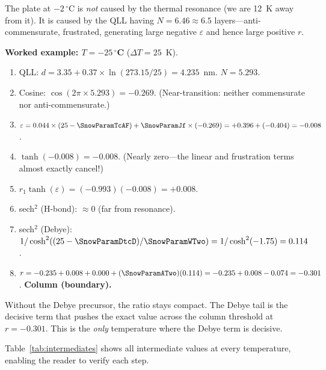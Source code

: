 \documentclass[12pt,letterpaper]{article}
\begin{document}
The plate at $-2\,{}^\circ$C is \emph{not} caused by the thermal resonance (we are 12~K away from it).  It is caused by the QLL having $N = 6.46 \approx 6.5$ layers---anti-commensurate, frustrated, generating large negative $\varepsilon$ and hence large positive $r$.

\medskip
\textbf{Worked example: $T = -25\,{}^\circ$C} ($\Delta T = 25$~K).

\begin{enumerate}
\item QLL: $d = 3.35 + 0.37 \times \ln(273.15/25) = 4.235$~nm.  $N = 5.293$.
\item Cosine: $\cos(2\pi \times 5.293) = -0.269$.  (Near-transition: neither commensurate nor anti-commensurate.)
\item $\varepsilon = 0.044 \times (25 - \SnowParamTcAF) + \SnowParamJf \times (-0.269) = +0.396 + (-0.404) = -0.008$.
\item $\tanh(-0.008) = -0.008$.  (Nearly zero---the linear and frustration terms almost exactly cancel!)
\item $r_1 \tanh(\varepsilon) = (-0.993)(-0.008) = +0.008$.
\item sech$^2$ (H-bond): $\approx 0$ (far from resonance).
\item sech$^2$ (Debye): $1/\cosh^2((25 - \SnowParamDtcD)/\SnowParamWTwo) = 1/\cosh^2(-1.75) = 0.114$.
\item $r = -0.235 + 0.008 + 0.000 + (\SnowParamATwo)(0.114) = -0.235 + 0.008 - 0.074 = -0.301$.  \textbf{Column (boundary).} \checkmark
\end{enumerate}

Without the Debye precursor, the ratio stays compact.  The Debye tail is the decisive term that pushes the exact value across the column threshold at $r=-0.301$.  This is the \emph{only} temperature where the Debye term is decisive.

\bigskip

Table~\ref{tab:intermediates} shows all intermediate values at every temperature, enabling the reader to verify each step.
\end{document}
